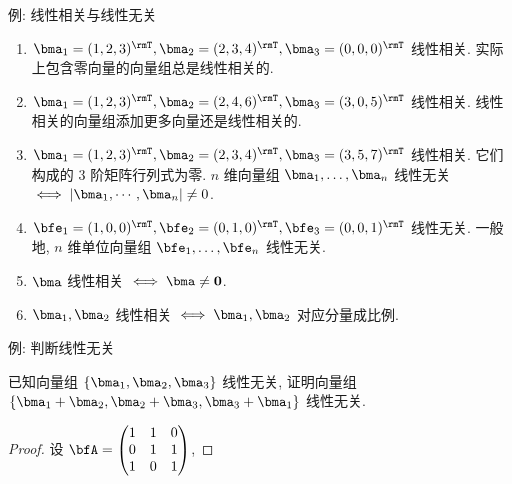 \begin{frame}{例: 线性相关与线性无关}
	\onslide<+->
	\begin{example}
		\begin{enumerate}
			\item $\bma_1=(1,2,3)^\rmT,\bma_2=(2,3,4)^\rmT,\bma_3=(0,0,0)^\rmT$ 线性相关.
			实际上\alert{包含零向量的向量组总是线性相关的}.
			\item $\bma_1=(1,2,3)^\rmT,\bma_2=(2,4,6)^\rmT,\bma_3=(3,0,5)^\rmT$ 线性相关.
			\alert{线性相关的向量组添加更多向量还是线性相关的}.
			\item $\bma_1=(1,2,3)^\rmT,\bma_2=(2,3,4)^\rmT,\bma_3=(3,5,7)^\rmT$ 线性相关.
			它们构成的 $3$ 阶矩阵行列式为零.
			\alert{$n$ 维向量组 $\bma_1,\dots,\bma_n$ 线性无关 $\iff |\bma_1,\cdots,\bma_n|\neq 0$}.
			\item $\bfe_1=(1,0,0)^\rmT,\bfe_2=(0,1,0)^\rmT,\bfe_3=(0,0,1)^\rmT$ 线性无关.
			一般地, \alert{$n$ 维单位向量组 $\bfe_1,\dots,\bfe_n$ 线性无关}.
			\item $\bma$ 线性相关 $\iff \bma\neq{\bf0}$.
			\item $\bma_1,\bma_2$ 线性相关 $\iff \bma_1,\bma_2$ 对应分量成比例.
		\end{enumerate}
	\end{example}
\end{frame}


\begin{frame}{例: 判断线性无关}
	\onslide<+->
	\begin{example}
		已知向量组 $\{\bma_1,\bma_2,\bma_3\}$ 线性无关, 证明向量组 $\{\bma_1+\bma_2,\bma_2+\bma_3,\bma_3+\bma_1\}$ 线性无关.
	\end{example}
	\onslide<+->
	\begin{proof}
		设 $\bfA=\begin{pmatrix}
			1&1&0\\
			0&1&1\\
			1&0&1
		\end{pmatrix}$,
		\vspace{-\baselineskip}
	\end{proof}
\end{frame}


